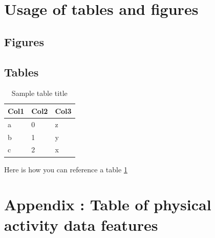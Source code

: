 \documentclass{article}
\begin{document}
\section{Usage of tables and figures}
\subsection{Figures}



\subsection{Tables}
\begin{table}
  \caption{Sample table title}
  \label{sample_table}
  \centering
  \begin{tabular}{lll}
    \toprule
    \cmidrule(r){1-2}
    Col1 & Col2 & Col3 \\
    \hline
    a & 0 & z\\
    b & 1 & y \\
    c & 2 & x \\
    \bottomrule
  \end{tabular}
\end{table}

Here is how you can reference a table \ref{sample_table}




\appendix

\section{Appendix : Table of physical activity data features}
\end{document}
